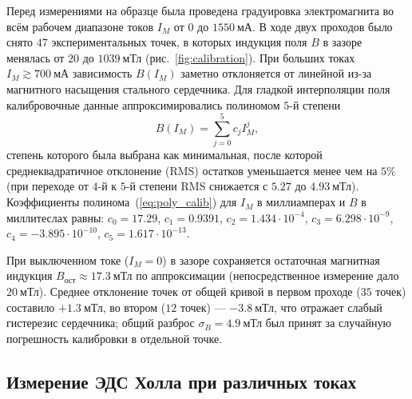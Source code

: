 \documentclass[reprint, amsmath, amssymb, aps, pra, nofootinbib]{revtex4-2}
\begin{document}
Перед измерениями на образце была проведена градуировка электромагнита во всём рабочем диапазоне токов $I_M$ от $0$ до $1550~\text{мА}$.
В ходе двух проходов было снято $47$ экспериментальных точек, в которых индукция поля $B$ в зазоре менялась от $20$ до $1039~\text{мТл}$ (рис.~\ref{fig:calibration}).
При больших токах $I_M \gtrsim 700~\text{мА}$ зависимость $B(I_M)$ заметно отклоняется от линейной из-за магнитного насыщения стального сердечника.
Для гладкой интерполяции поля калибровочные данные аппроксимировались полиномом $5$-й степени
\begin{equation}
B(I_M) = \sum_{j=0}^{5} c_j I_M^j,
\label{eq:poly_calib}
\end{equation}
степень которого была выбрана как минимальная, после которой среднеквадратичное отклонение (RMS) остатков уменьшается менее чем на $5\%$ (при переходе от $4$-й к $5$-й степени RMS снижается с $5.27$ до $4.93~\text{мТл}$).
Коэффициенты полинома~(\ref{eq:poly_calib}) для $I_M$ в миллиамперах и $B$ в миллитеслах равны: $c_0 = 17.29$, $c_1 = 0.9391$, $c_2 = 1.434 \cdot 10^{-4}$, $c_3 = 6.298 \cdot 10^{-9}$, $c_4 = -3.895 \cdot 10^{-10}$, $c_5 = 1.617 \cdot 10^{-13}$. 

При выключенном токе ($I_M = 0$) в зазоре сохраняется остаточная магнитная индукция $B_{\text{ост}} \approx 17.3~\text{мТл}$ по аппроксимации (непосредственное измерение дало $20~\text{мТл}$). 
Среднее отклонение точек от общей кривой в первом проходе ($35$ точек) составило $+1.3~\text{мТл}$, во втором ($12$ точек) — $-3.8~\text{мТл}$, что отражает слабый гистерезис сердечника; общий разброс $\sigma_B = 4.9~\text{мТл}$ был принят за случайную погрешность калибровки в отдельной точке. 

\subsection{Измерение ЭДС Холла при различных токах}
\end{document}
